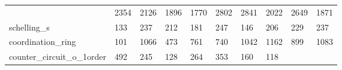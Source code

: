 \begin{table}[t]
\begin{center}
\begin{tabular}{llllllllll}
           & 2354
        
           & 2126
        
           & 1896
        
           & 1770
        
           & 2802
        
           & 2841
        
           & 2022
        
           & 2649
        
           & 1871
         \\

        schelling\_s
        
           & 133
        
           & 237
        
           & 212
        
           & 181
        
           & 247
        
           & 146
        
           & 206
        
           & 229
        
           & 237
         \\

        coordination\_ring
        
           & 101
        
           & 1066
        
           & 473
        
           & 761
        
           & 740
        
           & 1042
        
           & 1162
        
           & 899
        
           & 1083
         \\

        counter\_circuit\_o\_1order
        
           & 492
        
           & 245
        
           & 128
        
           & 264
        
           & 353
        
           & 160
        
           & 118
        

\end{tabular}
\end{center}
\end{table}
